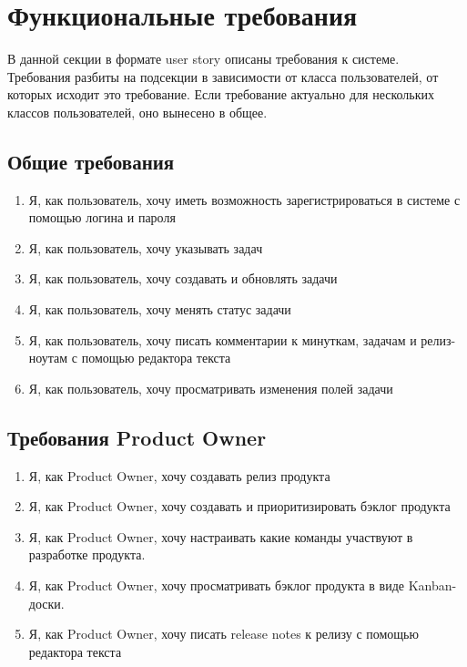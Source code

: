 \section{Функциональные требования}

В данной секции в формате user story описаны требования к системе.
Требования разбиты на подсекции в зависимости от класса пользователей,
от которых исходит это требование.
Если требование актуально для нескольких классов пользователей, оно
вынесено в общее.

\subsection{Общие требования}
\begin{enumerate}[label=\textbf{FR\arabic*}.]
  \item Я, как пользователь, хочу иметь возможность зарегистрироваться в системе с помощью логина и пароля
  \item Я, как пользователь, хочу указывать  задач
  \item Я, как пользователь, хочу создавать и обновлять задачи
  \item Я, как пользователь, хочу менять статус задачи
  \item Я, как пользователь, хочу писать комментарии к минуткам, задачам и релиз-ноутам с помощью редактора текста
  \item Я, как пользователь, хочу просматривать изменения полей задачи
\end{enumerate}

\subsection{Требования Product Owner}
\begin{enumerate}[label=\textbf{POR\arabic*}.]
  \item Я, как Product Owner, хочу создавать релиз продукта
  \item Я, как Product Owner, хочу создавать и приоритизировать бэклог продукта
  \item Я, как Product Owner, хочу настраивать какие команды участвуют в разработке продукта.
  \item Я, как Product Owner, хочу просматривать бэклог продукта в виде Kanban-доски.
  \item Я, как Product Owner, хочу писать release notes к релизу с помощью редактора текста
\end{enumerate}

